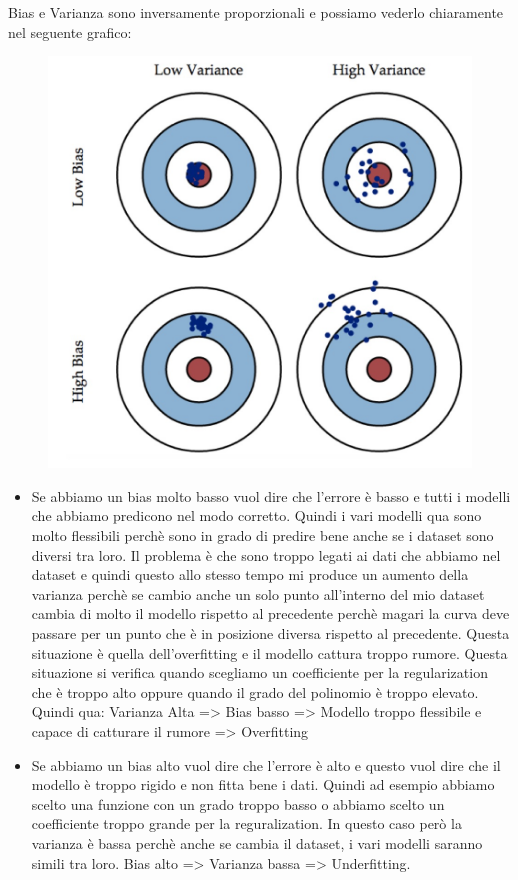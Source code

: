 \documentclass[14pt]{extreport}
\begin{document}
Bias e Varianza sono inversamente proporzionali e possiamo vederlo chiaramente nel seguente grafico:
\begin{figure}[H]
	\centering
	\includegraphics[width=0.6\linewidth]{93.jpeg}
\end{figure}
\begin{itemize}
	\item Se abbiamo un bias molto basso vuol dire che l'errore è basso e tutti i modelli che abbiamo predicono nel modo corretto. Quindi i vari
	      modelli qua sono molto flessibili perchè sono in grado di predire bene anche se i dataset sono diversi tra loro. Il problema è che sono
	      troppo legati ai dati che abbiamo nel dataset e quindi questo allo stesso tempo mi produce un aumento della varianza perchè se cambio anche
	      un solo punto all'interno del mio dataset cambia di molto il modello rispetto al precedente perchè magari la curva deve passare per un punto
	      che è in posizione diversa rispetto al precedente. Questa situazione è quella dell'overfitting e il modello cattura troppo rumore. Questa
	      situazione si verifica quando scegliamo un coefficiente per la regularization che è troppo alto oppure quando il grado del polinomio è
	      troppo elevato. Quindi qua: Varianza Alta => Bias basso => Modello troppo flessibile e capace di catturare il rumore => Overfitting
	\item Se abbiamo un bias alto vuol dire che l'errore è alto e questo vuol dire che il modello è troppo rigido e non fitta bene i dati. Quindi ad
	      esempio abbiamo scelto una funzione con un grado troppo basso o abbiamo scelto un coefficiente troppo grande per la reguralization. In
	      questo caso però la varianza è bassa perchè anche se cambia il dataset, i vari modelli saranno simili tra loro. Bias alto => Varianza bassa
	      => Underfitting.
\end{itemize}
\end{document}
